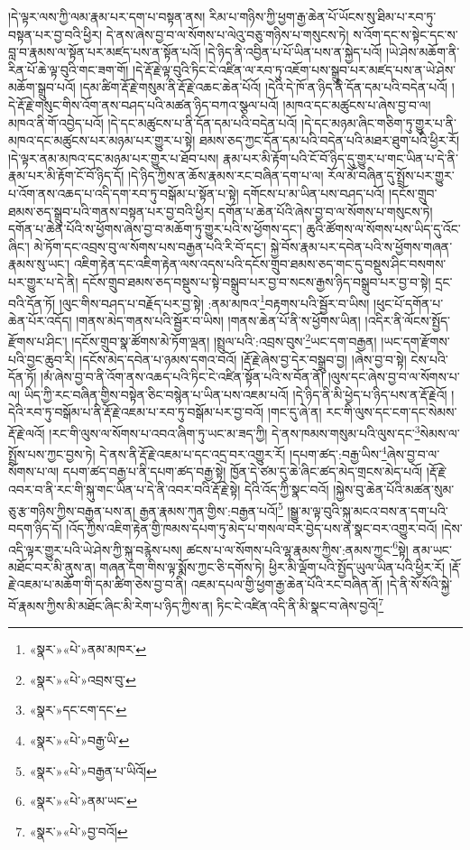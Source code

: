 །དེ་ལྟར་ལས་ཀྱི་ལམ་རྣམ་པར་དག་པ་བསྟན་ནས། རིམ་པ་གཉིས་ཀྱི་ཕྱག་རྒྱ་ཆེན་པོ་ཡོངས་སུ་ཐིམ་པ་རབ་ཏུ་བསྟན་པར་བྱ་བའི་ཕྱིར། དེ་ནས་ཞེས་བྱ་བ་ལ་སོགས་པ་ལེའུ་བཅུ་གཉིས་པ་གསུངས་ཏེ། ས་འོག་དང་ས་སྟེང་དང་ས་བླ་བ་རྣམས་ལ་སྟོན་པར་མཛད་པས་ན་སྟོན་པའོ། །དེ་ཉིད་ནི་འབྱིན་པ་པོ་ཡིན་པས་ན་སྐྱེད་པའོ། །ཡེ་ཤེས་མཆོག་ནི་རིན་པོ་ཆེ་ལྟ་བུའི་གང་ཟག་གོ། །དེ་རྡོ་རྗེ་ལྟ་བུའི་ཏིང་ངེ་འཛིན་ལ་རབ་ཏུ་འཇོག་པས་སྒྲུབ་པར་མཛད་པས་ན་ཡེ་ཤེས་མཆོག་སྒྲུབ་པའོ། །དམ་ཚིག་རྡོ་རྗེ་གསུམ་ནི་རྡོ་རྗེ་འཆང་ཆེན་པོའོ། །དེའི་དེ་ཁོ་ན་ཉིད་ནི་དོན་དམ་པའི་བདེན་པའོ། །དེ་རྡོ་རྗེ་གསུང་གིས་འོག་ནས་བཤད་པའི་མཚན་ཉིད་བཀའ་སྩལ་པའོ། །མཁའ་དང་མཚུངས་པ་ཞེས་བྱ་བ་ལ། མཁའ་ནི་གོ་འབྱེད་པའོ། །དེ་དང་མཚུངས་པ་ནི་དོན་དམ་པའི་བདེན་པའོ། །དེ་དང་མཉམ་ཞིང་གཅིག་ཏུ་གྱུར་པ་ནི་མཁའ་དང་མཚུངས་པར་མཉམ་པར་གྱུར་པ་སྟེ། ཐམས་ཅད་ཀྱང་དོན་དམ་པའི་བདེན་པའི་མཐར་ཐུག་པའི་ཕྱིར་རོ། །དེ་ལྟར་ནམ་མཁའ་དང་མཉམ་པར་གྱུར་པ་ཐོབ་པས། རྣམ་པར་མི་རྟོག་པའི་ངོ་བོ་ཉིད་དུ་གྱུར་པ་གང་ཡིན་པ་དེ་ནི་རྣམ་པར་མི་རྟོག་ངོ་བོ་ཉིད་དོ། །དེ་ཉིད་ཀྱིས་ན་ཆོས་རྣམས་རང་བཞིན་དག་པ་ལ། རོལ་མོ་བཞིན་དུ་སྤྲོས་པར་གྱུར་པ་འོག་ནས་འཆད་པ་འདི་དག་རབ་ཏུ་བསྒོམ་པ་སྟོན་པ་སྟེ། དགོངས་པ་མ་ཡིན་པས་བཤད་པའོ། །དངོས་གྲུབ་ཐམས་ཅད་སྒྲུབ་པའི་གནས་བསྟན་པར་བྱ་བའི་ཕྱིར། དགོན་པ་ཆེན་པོའི་ཞེས་བྱ་བ་ལ་སོགས་པ་གསུངས་ཏེ། དགོན་པ་ཆེན་པོའི་ས་ཕྱོགས་ཞེས་བྱ་བ་མཆོག་ཏུ་གྱུར་པའི་ས་ཕྱོགས་དང་། ཆུའི་ཚོགས་ལ་སོགས་པས་ཡིད་དུ་འོང་ཞིང་། མེ་ཏོག་དང་འབྲས་བུ་ལ་སོགས་པས་བརྒྱན་པའི་རི་བོ་དང་། སྐྱེ་བོས་རྣམ་པར་དབེན་པའི་ས་ཕྱོགས་གཞན་རྣམས་སུ་ཡང་། འཇིག་རྟེན་དང་འཇིག་རྟེན་ལས་འདས་པའི་དངོས་གྲུབ་ཐམས་ཅད་གང་དུ་བསྡུས་ཤིང་བསགས་པར་གྱུར་པ་དེ་ནི། དངོས་གྲུབ་ཐམས་ཅད་བསྡུས་པ་སྟེ་བསྒྲུབ་པར་བྱ་བ་སངས་རྒྱས་ཉིད་བསྒྲུབ་པར་བྱ་བ་སྟེ། དྲང་བའི་དོན་ཏོ། །ལུང་གིས་བཤད་པ་བརྗོད་པར་བྱ་སྟེ། :ནམ་མཁའ་\footnote{«སྣར་»«པེ་»ནམ་མཁར་}བརྟགས་པའི་སྦྱོར་བ་ཡིས། །ཕུང་པོ་དགོན་པ་ཆེན་པོར་འདོད། །གནས་མེད་གནས་པའི་སྦྱོར་བ་ཡིས། །གནས་ཆེན་པོ་ནི་ས་ཕྱོགས་ཡིན། །འདིར་ནི་ལོངས་སྤྱོད་རྫོགས་པ་ཤིང་། །དངོས་གྲུབ་སྣ་ཚོགས་མེ་ཏོག་ལྡན། །སྤྲུལ་པའི་:འབྲས་བུས་\footnote{«སྣར་»«པེ་»འབྲས་བུ་}ཡང་དག་བརྒྱན། །ཡང་དག་རྫོགས་པའི་བྱང་ཆུབ་རི། །དངོས་མེད་དབེན་པ་ཉམས་དགའ་བའོ། །རྡོ་རྗེ་ཞེས་བྱ་དེར་བསྒྲུབ་བྱ། །ཞེས་བྱ་བ་སྟེ། ངེས་པའི་དོན་ཏོ། །མཾ་ཞེས་བྱ་བ་ནི་འོག་ནས་འཆད་པའི་ཏིང་ངེ་འཛིན་སྟོན་པའི་ས་བོན་ནོ། །ལུས་དང་ཞེས་བྱ་བ་ལ་སོགས་པ་ལ། ཡིད་ཀྱི་རང་བཞིན་གྱིས་བསྟེན་ཅིང་བསྙེན་པ་ཡིན་པས་འཇམ་པའོ། །དེ་ཉིད་ནི་མི་ཕྱེད་པ་ཉིད་པས་ན་རྡོ་རྗེའོ། །དེའི་རབ་ཏུ་བསྒོམ་པ་ནི་རྡོ་རྗེ་འཇམ་པ་རབ་ཏུ་བསྒོམ་པར་བྱ་བའོ། །གང་དུ་ཞེ་ན། རང་གི་ལུས་དང་ངག་དང་སེམས་རྡོ་རྗེ་ལའོ། །རང་གི་ལུས་ལ་སོགས་པ་འབའ་ཞིག་ཏུ་ཡང་མ་ཟད་ཀྱི། དེ་ནས་ཁམས་གསུམ་པའི་ལུས་དང་\footnote{«སྣར་»དང་ངག་དང་}སེམས་ལ་སྤྲོས་པས་ཀྱང་བྱས་ཏེ། དེ་ནས་ནི་རྡོ་རྗེ་འཇམ་པ་དང་འདྲ་བར་འགྱུར་རོ། །དཔག་ཚད་:བརྒྱ་ཡིས་\footnote{«སྣར་»«པེ་»བརྒྱ་ཡི་}ཞེས་བྱ་བ་ལ་སོགས་པ་ལ། དཔག་ཚད་བརྒྱ་པ་ནི་དཔག་ཚད་བརྒྱ་སྟེ། ཁྱོན་དེ་ཙམ་དུ་ཆེ་ཞིང་ཚད་མེད་གྲངས་མེད་པའོ། །རྡོ་རྗེ་འབར་བ་ནི་རང་གི་སྐུ་གང་ཡིན་པ་དེ་ནི་འབར་བའི་རྡོ་རྗེ་སྟེ། དེའི་འོད་ཀྱི་སྣང་བའོ། །སྐྱེས་བུ་ཆེན་པོའི་མཚན་སུམ་ཅུ་རྩ་གཉིས་ཀྱིས་བརྒྱན་པས་ན། རྒྱན་རྣམས་ཀུན་གྱིས་:བརྒྱན་པའོ།\footnote{«སྣར་»«པེ་»བརྒྱན་པ་ཡིའོ།} །སྒྱུ་མ་ལྟ་བུའི་སྐུ་མངའ་བས་ན་དག་པའི་བདག་ཉིད་དོ། །འོད་ཀྱིས་འཇིག་རྟེན་གྱི་ཁམས་དཔག་ཏུ་མེད་པ་གསལ་བར་བྱེད་པས་ན་སྣང་བར་འགྱུར་བའོ། །དེས་འདི་ལྟར་གྱུར་པའི་ཡེ་ཤེས་ཀྱི་སྐུ་བརྙེས་པས། ཚངས་པ་ལ་སོགས་པའི་ལྷ་རྣམས་ཀྱིས་:ནམས་ཀྱང་\footnote{«སྣར་»«པེ་»ནམ་ཡང་}སྟེ། ནམ་ཡང་མཐོང་བར་མི་ནུས་ན། གཞན་དག་གིས་ལྟ་སྨོས་ཀྱང་ཅི་དགོས་ཏེ། ཕྱིར་མི་ལྡོག་པའི་སྤྱོད་ཡུལ་ཡིན་པའི་ཕྱིར་རོ། །རྡོ་རྗེ་འཇམ་པ་མཆོག་གི་དམ་ཚིག་ཅེས་བྱ་བ་ནི། འཇམ་དཔལ་གྱི་ཕྱག་རྒྱ་ཆེན་པོའི་རང་བཞིན་ནོ། །དེ་ནི་སོ་སོའི་སྐྱེ་བོ་རྣམས་ཀྱིས་མི་མཐོང་ཞིང་མི་རེག་པ་ཉིད་ཀྱིས་ན། ཏིང་ངེ་འཛིན་འདི་ནི་མི་སྣང་བ་ཞེས་བྱའོ།\footnote{«སྣར་»«པེ་»བྱ་བའོ།} 